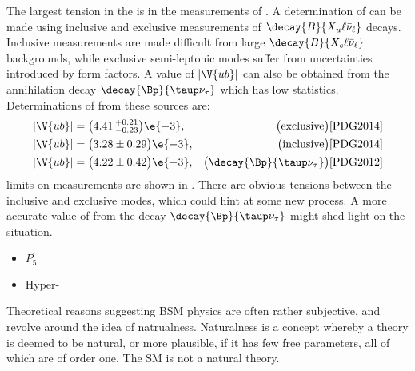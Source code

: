 The largest tension in the \ut is in  the measurements of .
A determination of  can be made using inclusive and exclusive measurements of
$\decay{B}{X_u\ell\bar\nu_\ell}$ decays.
Inclusive measurements are made difficult from large
$\decay{B}{X_c\ell\bar\nu_\ell}$ backgrounds, while exclusive semi-leptonic modes suffer from
uncertainties introduced by form factors.
A value of $\left|\V{ub}\right|$ can also be obtained from the annihilation decay
$\decay{\Bp}{\taup\nu_\tau}$ which has low statistics.
Determinations of  from these sources are:
\begin{align}
  |\V{ub}| &= \big(4.41\,^{+0.21}_{-0.23}\big)\e{-3}, & \quad\big(\mathrm{exclusive}\big)\text{\cite{PDG2014}}& \nonumber\\
  |\V{ub}| &= \big(3.28\pm{0.29}\big)\e{-3},  & \big(\mathrm{inclusive}\big)\text{\cite{PDG2014}}&\nonumber\\
  |\V{ub}| &= \big(4.22\pm{0.42}\big)\e{-3},  & \big(\decay{\Bp}{\taup\nu_\tau}\big)\text{\cite{PDG2012}}&\nonumber\\
  \label{eq:th:vub}
\end{align}
limits on \ut measurements are shown in .
There are obvious tensions between the inclusive and exclusive modes, which could hint at some new
process.
A more accurate value of  from the decay $\decay{\Bp}{\taup\nu_\tau}$ might shed light on the
situation.



\begin{itemize}
  \item $P_5^\prime$
  \item Hyper-\CP
\end{itemize}

















Theoretical reasons suggesting BSM physics
are often rather subjective, and revolve around the idea of natrualness.
Naturalness is a concept whereby a theory is deemed to be natural, or more plausible, if it has few
free parameters, all of which are of order one.
The SM is not a natural theory.

